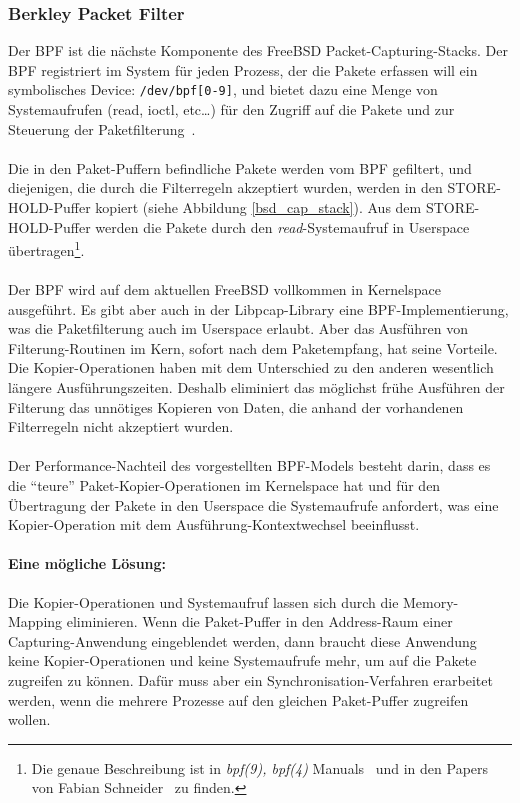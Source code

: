 \subsubsection{Berkley Packet Filter}\label{sec:bpf}
Der BPF ist die nächste Komponente des FreeBSD Packet-Capturing-Stacks. Der BPF
registriert im System für jeden Prozess, der die Pakete erfassen will ein
symbolisches Device: \verb+/dev/bpf[0-9]+, und bietet dazu eine Menge von
Systemaufrufen (read, ioctl, etc\ldots) für den Zugriff auf die Pakete und zur
Steuerung der Paketfilterung~\cite{man_kernel_bpf, man_bpf, bpf_paper}.\\\\
%
Die in den Paket-Puffern befindliche Pakete werden vom BPF gefiltert, und
diejenigen, die durch die Filterregeln akzeptiert wurden, werden in den
STORE-HOLD-Puffer kopiert (siehe Abbildung \ref{bsd_cap_stack}).  Aus dem
STORE-HOLD-Puffer werden die Pakete durch den \emph{read}-Systemaufruf in
Userspace übertragen\footnote{Die genaue Beschreibung ist in \emph{bpf(9),
bpf(4)} Manuals~\cite{man_kernel_bpf, man_bpf} und in den Papers von Fabian
Schneider~\cite{fabian_da, pcin10gb_paper} zu finden.}.\\\\
%
Der BPF wird auf dem aktuellen FreeBSD vollkommen in Kernelspace ausgeführt.
Es gibt aber auch in der Libpcap-Library eine BPF-Implementierung, was  die
Paketfilterung auch im Userspace erlaubt. Aber das Ausführen von
Filterung-Routinen im Kern, sofort nach dem Paketempfang, hat seine Vorteile.
Die Kopier-Operationen haben mit dem Unterschied zu den anderen wesentlich
längere Ausführungszeiten. Deshalb eliminiert das möglichst frühe Ausführen der
Filterung  das unnötiges Kopieren von Daten, die anhand der vorhandenen
Filterregeln nicht akzeptiert wurden.\\\\
%
Der Performance-Nachteil des vorgestellten BPF-Models besteht darin, dass es
die ``teure'' Paket-Kopier-Operationen im Kernelspace hat und für den
Übertragung der Pakete in den Userspace die Systemaufrufe anfordert, was eine
Kopier-Operation mit dem Ausführung-Kontextwechsel beeinflusst.
%
\paragraph*{Eine mögliche Lösung:}
Die Kopier-Operationen und Systemaufruf lassen sich durch die Memory-Mapping
eliminieren. Wenn die Paket-Puffer in den Address-Raum einer
Capturing-Anwendung eingeblendet werden, dann braucht diese Anwendung keine
Kopier-Operationen und keine Systemaufrufe mehr, um auf die Pakete zugreifen zu
können. Dafür muss aber ein Synchronisation-Verfahren erarbeitet werden, wenn
die mehrere Prozesse auf den gleichen Paket-Puffer zugreifen wollen.

